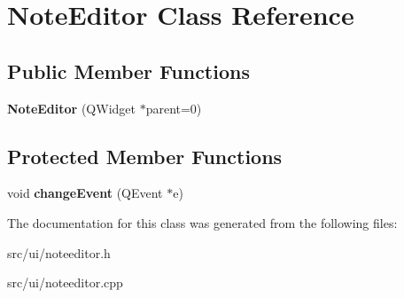 \hypertarget{classNoteEditor}{
\section{NoteEditor Class Reference}
\label{classNoteEditor}
}
\subsection*{Public Member Functions}
\begin{DoxyCompactItemize}
\item 
\hypertarget{classNoteEditor_ac74f18e23164c3ac16dbd0a7465077e4}{
{\bfseries NoteEditor} (QWidget $\ast$parent=0)}
\label{classNoteEditor_ac74f18e23164c3ac16dbd0a7465077e4}

\end{DoxyCompactItemize}
\subsection*{Protected Member Functions}
\begin{DoxyCompactItemize}
\item 
\hypertarget{classNoteEditor_a342f639871c0ff0fcec29692b04f3f84}{
void {\bfseries changeEvent} (QEvent $\ast$e)}
\label{classNoteEditor_a342f639871c0ff0fcec29692b04f3f84}

\end{DoxyCompactItemize}


The documentation for this class was generated from the following files:\begin{DoxyCompactItemize}
\item 
src/ui/noteeditor.h\item 
src/ui/noteeditor.cpp\end{DoxyCompactItemize}

